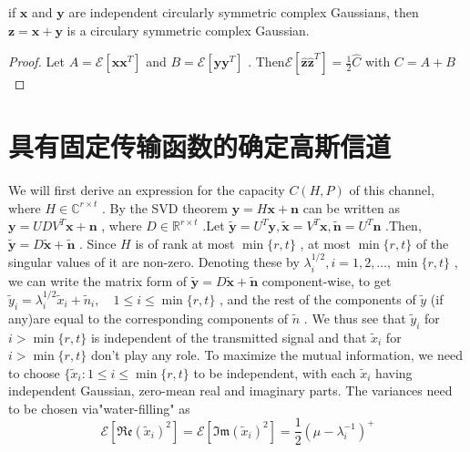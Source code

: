 \documentclass[10pt,a4paper,UTF8]{article}
\begin{document}
\begin{theorem}
if \(\mathbf{x}\) and \(\mathbf{y}\) are independent circularly symmetric complex Gaussians, then \(\mathbf{z} = \mathbf{x} + \mathbf{y}\) is a circulary symmetric complex Gaussian.
\end{theorem}
\begin{proof}
Let \(A=\mathcal{E}[\mathbf{xx}^{T}]\) and \(B=\mathcal{E}[\mathbf{yy}^{T}]\) . Then\(\mathcal{E}[\hat{\mathbf{z}}\hat{\mathbf{z}}^{T}]= \frac{1}{2}\hat{C}\) with \(C=A+B\)
\end{proof}

\section{具有固定传输函数的确定高斯信道}
\label{sec:org92b2ba7}

We will first derive an expression for the capacity \(C(H,P)\) of this channel, where \(H\in \mathbb{C}^{r\times t}\) . By the SVD theorem \(\mathbf{y} = H\mathbf{x}+ \mathbf{n}\) can be written as \(\mathbf{y}=UDV^{T}\mathbf{x}+\mathbf{n}\) , where \(D\in \mathbb{R}^{r\times t}\) .Let \(\tilde{\mathbf{y}} = U^{T}\mathbf{y}, \tilde{\mathbf{x}} = V^{T}\mathbf{x}, \tilde{\mathbf{n}} = U^{T}\mathbf{n}\) .Then, \(\tilde{\mathbf{y}} = D\tilde{\mathbf{x}} +\tilde{\mathbf{n}}\) . Since \(H\) is of rank at most \(\min\{r,t\}\) , at most  \(\min\{r,t\}\) of the singular values of it are non-zero. Denoting these by \(\lambda_i^{1/2},i = 1,2,\dots, \min\{r,t\}\) , we can write the matrix form of \(\tilde{\mathbf{y}} = D\tilde{\mathbf{x}} +\tilde{\mathbf{n}}\) component-wise, to get \(\tilde{y}_i = \lambda_{i}^{1/2}\tilde{x}_{i}+ \tilde{n}_{i}, \quad 1\le i \le  \min\{r,t\}\) , and the rest of the components of \(\tilde{y}\) (if any)are equal to the corresponding components of \(\tilde{n}\) . We thus see that \(\tilde{y}_{i}\) for \(i>  \min\{r,t\}\) is independent of the transmitted signal and that \(\tilde{x}_i\) for \(i> \min\{r,t\}\) don't play any role. To maximize the mutual information, we need to choose \(\{ \tilde{x}_i:1\le i \le  \min\{r,t\}\) to be independent, with each \(\tilde{x}_i\) having independent Gaussian, zero-mean real and imaginary parts. The variances need to be chosen via"water-filling" as
\begin{equation}
  \label{eq:20120323erexi}
  \mathcal{E}[\mathfrak{Re}(\tilde{x}_i)^2] =  \mathcal{E}[\mathfrak{Im}(\tilde{x}_i)^2]  = \frac{1}{2} (\mu -\lambda_i^{-1})^+
\end{equation}
\end{document}
